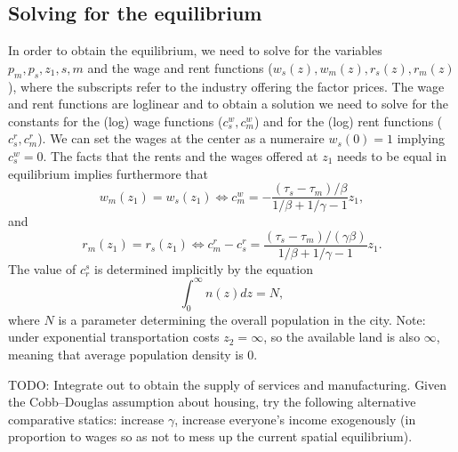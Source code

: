 \documentclass[10pt]{article}
\begin{document}
\subsection{Solving for the equilibrium}
In order to obtain the equilibrium, we need to solve for the variables $p_m,p_s,z_1,s,m$ and the wage and rent functions ($w_s(z),w_m(z),r_s(z),r_m(z)$), where the subscripts refer to the industry offering the factor prices. The wage and rent functions are loglinear and to obtain a solution we need to solve for the constants for the (log) wage functions ($c^w_s,c^w_m$) and for the (log) rent functions ($c^r_s, c^r_m$). We can set the wages at the center as a numeraire $w_s(0)=1$ implying $c^w_s=0$. The facts that the rents and the wages offered at $z_1$ needs to be equal in equilibrium implies furthermore that
\begin{equation*}
w_m(z_1)=w_s(z_1) \Leftrightarrow c^w_m=-\frac{(\tau_s-\tau_m)/\beta}{1/\beta+1/\gamma-1}z_1,
\end{equation*}
and 
\begin{equation*}
r_m(z_1)=r_s(z_1) \Leftrightarrow c^r_m-c^r_s=\frac{(\tau_s-\tau_m)/(\gamma\beta)}{1/\beta+1/\gamma-1}{z_1}.
\end{equation*}
The value of $c_r^s$ is determined implicitly by the equation
\begin{equation*}
\int_0^\infty n(z)dz=N,
\end{equation*}
where $N$ is a parameter determining the overall population in the city. Note: under exponential transportation costs $z_2=\infty$, so the available land is also $\infty$, meaning that average population density is 0.



TODO: Integrate out to obtain the supply of services and manufacturing. Given the Cobb--Douglas assumption about housing, try the following alternative comparative statics: increase $\gamma$, increase everyone's income exogenously (in proportion to wages so as not to mess up the current spatial equilibrium).
\end{document}
